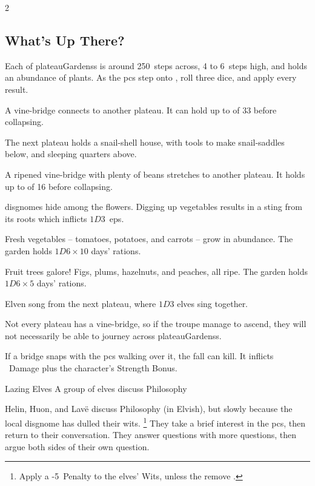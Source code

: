 \begin{multicols}{2}

\subsection{What's Up There?}

Each of \glspl{plateauGardens} is around 250~\glspl{step} across, 4 to 6~\glspl{step} high, and holds an abundance of plants.
As the \glspl{pc} step onto , roll three dice, and apply every result.

\begin{dlist}
  \item
  A vine-bridge connects to another plateau.
  It can hold up to  of 33 before collapsing.
  
  The next plateau holds a snail-shell house, with tools to make snail-saddles below, and sleeping quarters above.
  \item
  A ripened vine-bridge with plenty of beans stretches to another plateau.
  It holds up to  of 16 before collapsing.
  \item
  \Glspl{disgnome} hide among the flowers.
  Digging up vegetables results in a sting from its roots which inflicts $1D3$~\glspl{ep}.
  \item
  Fresh vegetables -- tomatoes, potatoes, and carrots -- grow in abundance.
  The garden holds $1D6 \times 10$ days' \glspl{ration}.
  \item
  Fruit trees galore!
  Figs, plums, hazelnuts, and peaches, all ripe.
  The garden holds $1D6 \times 5$ days' \glspl{ration}.
  \item
  Elven song from the next plateau, where $1D3$ elves sing together.
\end{dlist}

Not every plateau has a vine-bridge, so if the troupe manage to ascend, they will not necessarily be able to journey across \glspl{plateauGardens}.

If a bridge snaps with the \glspl{pc} walking over it, the fall can kill.
It inflicts ~Damage plus the character's Strength Bonus.


{Lazing Elves}%
{A group of elves discuss Philosophy}%

Helin, Huon, and Lav\"e discuss Philosophy (in Elvish), but slowly because the local \gls{disgnome} has dulled their wits.%
\footnote{Apply a -5~Penalty to the elves' Wits, unless the  remove .}
They take a brief interest in the \glspl{pc}, then return to their conversation.
They answer questions with more questions, then argue both sides of their own question.


\end{multicols}
